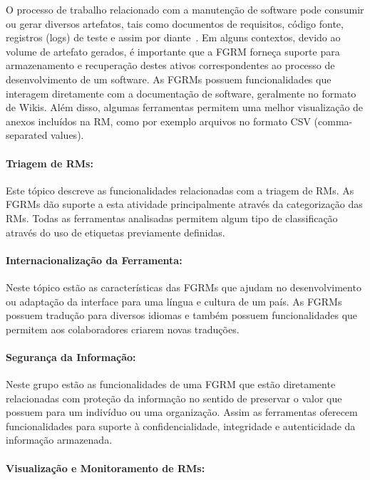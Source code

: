O processo de trabalho relacionado com a manutenção de software pode consumir
ou gerar diversos artefatos, tais como documentos de requisitos, código fonte,
registros (logs) de teste e assim por diante~\cite{cavalcanti2013bug}. Em
alguns contextos, devido ao volume de artefato gerados, é importante que a FGRM
forneça suporte para armazenamento e recuperação destes ativos correspondentes
ao processo de desenvolvimento de um software. As FGRMs possuem funcionalidades
que interagem diretamente com a documentação de software, geralmente no formato
de Wikis. Além disso, algumas ferramentas permitem uma melhor visualização de
anexos incluídos na RM, como por exemplo arquivos no formato CSV
(comma-separated values).

\paragraph{Triagem de RMs:}
\label{par:triagem_de_rm_s}

Este tópico descreve as funcionalidades relacionadas com a triagem de RMs. As
FGRMs dão suporte a esta atividade principalmente através da categorização das
RMs. Todas as ferramentas analisadas permitem algum tipo de classificação
através do uso de etiquetas previamente definidas.

\paragraph{Internacionalização da Ferramenta:}
\label{par:internacionalização_da_ferramenta}

Neste tópico estão as características das FGRMs que ajudam no desenvolvimento ou
adaptação da interface para uma língua e cultura de um país. As FGRMs possuem
tradução para diversos idiomas e também possuem funcionalidades que permitem aos
colaboradores criarem novas traduções.

\paragraph{Segurança da Informação:}
\label{par:segurança_da_informação}

Neste grupo estão as funcionalidades de uma FGRM que estão diretamente
relacionadas com proteção da informação no sentido de preservar o valor que
possuem para um indivíduo ou uma organização. Assim as ferramentas oferecem
funcionalidades para suporte à confidencialidade, integridade e autenticidade da
informação armazenada.

\paragraph{Visualização e Monitoramento de RMs:}
\label{par:visualização_de_rm_s}

